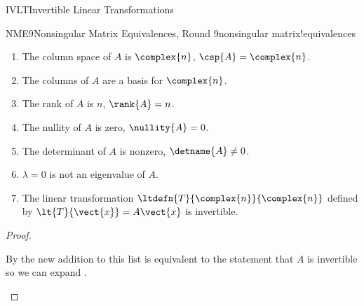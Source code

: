 \begin{subsect}{IVLT}{Invertible Linear Transformations}
\begin{theorem}{NME9}{Nonsingular Matrix Equivalences, Round 9}{nonsingular matrix!equivalences}
\begin{para}
\begin{enumerate}
\item The column space of $A$ is $\complex{n}$, $\csp{A}=\complex{n}$.
\item The columns of $A$ are a basis for $\complex{n}$.
\item The rank of $A$ is $n$, $\rank{A}=n$.
\item The nullity of $A$ is zero, $\nullity{A}=0$.
\item The determinant of $A$ is nonzero, $\detname{A}\neq 0$.
\item $\lambda=0$ is not an eigenvalue of $A$.
\item The linear transformation $\ltdefn{T}{\complex{n}}{\complex{n}}$ defined by $\lt{T}{\vect{x}}=A\vect{x}$ is invertible.
\end{enumerate}
\end{para}
\end{theorem}
%
\begin{proof}
\begin{para}By  the new addition to this list is equivalent to the statement that $A$ is invertible so we can expand .\end{para}
\end{proof}
%
%
\end{subsect}
%
